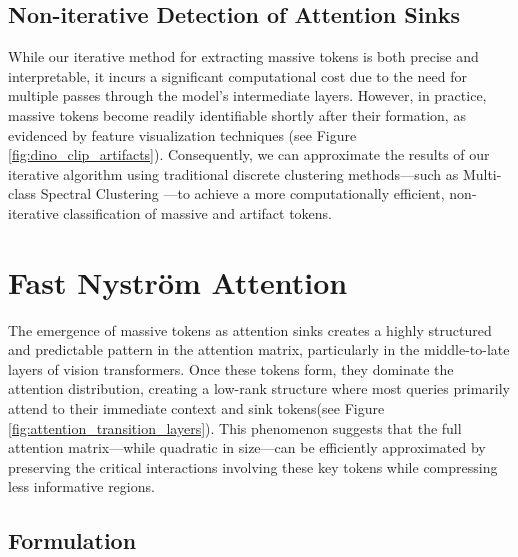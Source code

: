 \documentclass[10pt,twocolumn,letterpaper]{article}
\begin{document}
\subsection{Non-iterative Detection of Attention Sinks}
\label{sec:artifact_classifier}

While our iterative method for extracting massive tokens is both precise and interpretable, it incurs a significant computational cost due to the need for multiple passes through the model's intermediate layers. However, in practice, massive tokens become readily identifiable shortly after their formation, as evidenced by feature visualization techniques (see Figure \ref{fig:dino_clip_artifacts}). Consequently, we can approximate the results of our iterative algorithm using traditional discrete clustering methods—such as Multi-class Spectral Clustering \cite{shi2000ncut} \cite{yang2024ncut}—to achieve a more computationally efficient, non-iterative classification of massive and artifact tokens.

 \section{Fast Nystr\"om Attention}
\label{sec:fna}

The emergence of massive tokens as attention sinks creates a highly structured and predictable pattern in the attention matrix, particularly in the middle-to-late layers of vision transformers. Once these tokens form, they dominate the attention distribution, creating a low-rank structure where most queries primarily attend to their immediate context and sink tokens(see Figure \ref{fig:attention_transition_layers}). This phenomenon suggests that the full attention matrix—while quadratic in size—can be efficiently approximated by preserving the critical interactions involving these key tokens while compressing less informative regions. 

\subsection{Formulation}
\label{sec:formulation}
\end{document}
